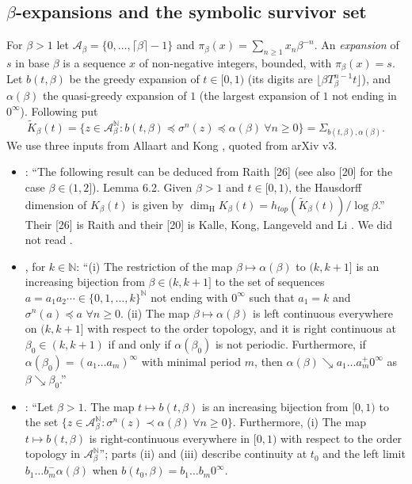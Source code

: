 \documentclass[11pt]{amsart}
\theoremstyle{definition}
\theoremstyle{remark}
\newcommand{\N}{\mathbb{N}}
\newcommand{\dimH}{\dim_{\mathrm H}}
\newcommand{\lex}{\preccurlyeq}
\newcommand{\A}{\mathcal{A}}
\newcommand{\K}{\tilde K}
\begin{document}
\subsection{\texorpdfstring{$\beta$-expansions and the symbolic survivor set}{beta-expansions and the symbolic survivor set}}
For $\beta>1$ let $\A_\beta=\{0,\dots,\lceil\beta\rceil-1\}$ and $\pi_\beta(x)=\sum_{n\ge1}x_n\beta^{-n}$. An \emph{expansion} of $s$ in base $\beta$ is a sequence $x$ of non-negative integers, bounded, with $\pi_\beta(x)=s$. Let $b(t,\beta)$ be the greedy expansion of $t\in[0,1)$ (its digits are $\lfloor\beta T_\beta^{n-1}t\rfloor$), and $\alpha(\beta)$ the quasi-greedy expansion of $1$ (the largest expansion of $1$ not ending in $0^\infty$). Following \cite[(6.1)]{AKgen} put
\[
\K_\beta(t)=\{z\in\A_\beta^{\N}:b(t,\beta)\lex\sigma^n(z)\lex\alpha(\beta)\ \forall n\ge0\}=\Sigma_{b(t,\beta),\alpha(\beta)}.
\]
We use three inputs from Allaart and Kong \cite{AKgen}, quoted from arXiv v3.

\begin{itemize}
\item[(I1)] \cite[Lemma~6.2]{AKgen}: ``The following result can be deduced from Raith [26] (see also [20] for the case $\beta\in(1,2]$). Lemma 6.2. Given $\beta>1$ and $t\in[0,1)$, the Hausdorff dimension of $K_\beta(t)$ is given by $\dimH K_\beta(t)=h_{top}(\K_\beta(t))/\log\beta$.'' Their [26] is Raith \cite{Raith94} and their [20] is Kalle, Kong, Langeveld and Li \cite{KKLL}. We did not read \cite{Raith94}.
\item[(I2)] \cite[Lemma~4.1]{AKgen}, for $k\in\N$: ``(i) The restriction of the map $\beta\mapsto\alpha(\beta)$ to $(k,k+1]$ is an increasing bijection from $\beta\in(k,k+1]$ to the set of sequences $a=a_1a_2\cdots\in\{0,1,\dots,k\}^{\N}$ not ending with $0^\infty$ such that $a_1=k$ and $\sigma^n(a)\lex a$ $\forall n\ge0$. (ii) The map $\beta\mapsto\alpha(\beta)$ is left continuous everywhere on $(k,k+1]$ with respect to the order topology, and it is right continuous at $\beta_0\in(k,k+1)$ if and only if $\alpha(\beta_0)$ is not periodic. Furthermore, if $\alpha(\beta_0)=(a_1\dots a_m)^\infty$ with minimal period $m$, then $\alpha(\beta)\searrow a_1\dots a_m^+0^\infty$ as $\beta\searrow\beta_0$.''
\item[(I3)] \cite[Lemma~4.2]{AKgen}: ``Let $\beta>1$. The map $t\mapsto b(t,\beta)$ is an increasing bijection from $[0,1)$ to the set $\{z\in\A_\beta^{\N}:\sigma^n(z)\prec\alpha(\beta)\ \forall n\ge0\}$. Furthermore, (i) The map $t\mapsto b(t,\beta)$ is right-continuous everywhere in $[0,1)$ with respect to the order topology in $\A_\beta^{\N}$''; parts (ii) and (iii) describe continuity at $t_0$ and the left limit $b_1\dots b_m^-\alpha(\beta)$ when $b(t_0,\beta)=b_1\dots b_m0^\infty$.
\end{itemize}
\end{document}
